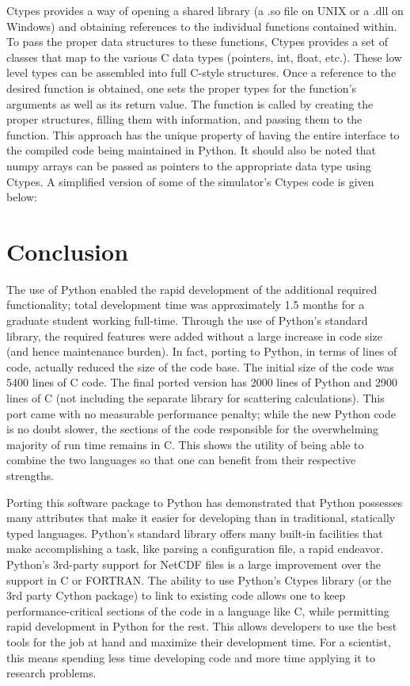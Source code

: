 \documentclass[twocolumn]{article}
\begin{document}
Ctypes provides a way of opening a shared library (a .so file on UNIX or a .dll
on Windows) and obtaining references to the individual functions contained
within. To pass the proper data structures to these functions, Ctypes provides
a set of classes that map to the various C data types (pointers, int, float, etc.).
These low level types can be assembled into full C-style structures. Once a reference
to the desired function is obtained, one sets the proper types for the function's
arguments as well as its return value. The function is called by creating the
proper structures, filling them with information, and passing them to the function.
This approach has the unique property of having the entire interface to the compiled
code being maintained in Python. It should also be noted that numpy arrays
can be passed as pointers to the appropriate data type using Ctypes.
A simplified version of some of the simulator's Ctypes code is given below:


\section{Conclusion}
The use of Python enabled the rapid development of the additional required
functionality; total development time was approximately 1.5 months for a graduate
student working full-time. Through the use of Python's standard library, the required
features were added without a large increase in code size (and hence maintenance
burden).  In fact, porting to Python, in terms of lines of code, actually reduced
the size of the code base. The initial size of the code was 5400 lines of C code.
The final ported version has 2000 lines of Python and 2900 lines of C (not including
the separate library for scattering calculations). This port came with no measurable
performance penalty; while the new Python code is no doubt slower, the sections of
the code responsible for the overwhelming majority of run time remains in C.
This shows the utility of being able to combine the two languages so that one
can benefit from their respective strengths.

Porting this software package to Python has demonstrated that Python possesses
many attributes that make it easier for developing than in traditional, statically
typed languages. Python's standard library offers many built-in facilities that
make accomplishing a task, like parsing a configuration file, a rapid endeavor.
Python's 3rd-party support for NetCDF files is a large improvement over the
support in C or FORTRAN.  The ability to use Python's Ctypes library (or the
3rd party Cython package) to link to existing code allows one to keep
performance-critical sections of the code in a language like C, while permitting
rapid development in Python for the rest. This allows developers to use the best
tools for the job at hand and maximize their development time. For a scientist,
this means spending less time developing code and more time applying
it to research problems.
\end{document}
